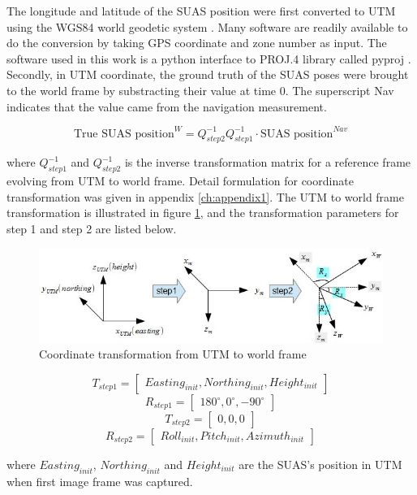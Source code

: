 The longitude and latitude of the SUAS position were first converted
to UTM using the WGS84 world geodetic system \cite{_world_????}. Many
software are readily available to do the conversion by taking GPS
coordinate and zone number as input. The software used in this work is
a python interface to PROJ.4 library \cite{_pyproj_????} called pyproj
\cite{_pyproj_????}. Secondly, in UTM coordinate, the ground truth of
the SUAS poses were brought to the world frame by substracting their
value at time 0. The superscript Nav indicates that the value came
from the navigation measurement.

$$\text{True SUAS position}^W = 
Q_{step2}^{-1}Q_{step1}^{-1} \cdot\text{SUAS position}^{Nav}$$

\noindent where $Q_{step1}^{-1}$ and $Q_{step2}^{-1}$ is the inverse
transformation matrix for a reference frame evolving from UTM to world
frame. Detail formulation for coordinate transformation was given in
appendix \ref{ch:appendix1}. The UTM to world frame transformation is
illustrated in figure \ref{fig:utm_to_world}, and the transformation
parameters for step 1 and step 2 are listed below.

\begin{figure}[h]
  \centering
  \includegraphics[width=12cm,keepaspectratio=true]{./Figures/utm_to_world.jpg}
  \caption{Coordinate transformation from UTM to world frame}
  \label{fig:utm_to_world}
\end{figure}

$$T_{step1} = \begin{bmatrix}Easting_{init}, Northing_{init},
  Height_{init}\end{bmatrix}$$
$$R_{step1} = \begin{bmatrix}180^{\circ}, 0^{\circ},
  -90^{\circ}\end{bmatrix}$$
$$T_{step2} = \begin{bmatrix}0, 0, 0\end{bmatrix}$$
$$R_{step2} = \begin{bmatrix}Roll_{init}, Pitch_{init},
  Azimuth_{init}\end{bmatrix}$$

\noindent where $Easting_{init}$, $Northing_{init}$ and
$Height_{init}$ are the SUAS's position in UTM when first image frame
was captured. 

